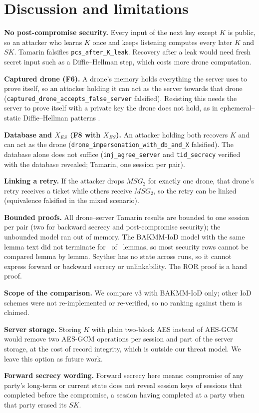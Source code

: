 \section{Discussion and limitations}\label{sec:discussion}

\textbf{No post-compromise security.} Every input of the next key except $K$ is public, so an attacker who learns $K$ once and
keeps listening computes every later $K$ and $SK$. Tamarin falsifies \texttt{pcs\_after\_K\_leak}. Recovery after a leak
\citep{cohngordon2016} would need fresh secret input such as a Diffie--Hellman step, which costs more drone computation.

\textbf{Captured drone (F6).} A drone's memory holds everything the server uses to prove itself, so an attacker holding it can
act as the server towards that drone (\texttt{captured\_drone\_accepts\_false\_server} falsified). Resisting this needs the
server to prove itself with a private key the drone does not hold, as in ephemeral--static Diffie--Hellman patterns
\citep{noise}.

\textbf{Database and $X_{ES}$ (F8 with $X_{ES}$).} An attacker holding both recovers $K$ and can act as the drone
(\texttt{drone\_impersonation\_with\_db\_and\_X} falsified). The database alone does not suffice
(\texttt{inj\_agree\_server} and \texttt{tid\_secrecy} verified with the database revealed; Tamarin, one session per pair).

\textbf{Linking a retry.} If the attacker drops $MSG_2$ for exactly one drone, that drone's retry receives a ticket while others
receive $MSG_2$, so the retry can be linked (equivalence falsified in the mixed scenario).

\textbf{Bounded proofs.} All drone--server Tamarin results are bounded to one session per pair (two for backward secrecy and
post-compromise security); the unbounded model ran out of memory. The BAKMM-IoD model with the same lemma text did not
terminate for \NumBakmmBaseDNT\ of \NumBakmmBaseLemmas\ lemmas, so most security rows cannot be compared lemma by lemma. Scyther has no state across runs, so it cannot express forward or backward secrecy or unlinkability. The ROR proof is a hand
proof.

\textbf{Scope of the comparison.} We compare v3 with BAKMM-IoD only; other IoD schemes were not re-implemented or re-verified,
so no ranking against them is claimed.

\textbf{Server storage.} Storing $K$ with plain two-block AES instead of AES-GCM would remove two AES-GCM operations per
session and part of the server storage, at the cost of record integrity, which is outside our threat model. We leave this
option as future work.

\textbf{Forward secrecy wording.} Forward secrecy here means: compromise of any party's long-term or current state does not
reveal session keys of sessions that completed before the compromise, a session having completed at a party when that party
erased its $SK$.
